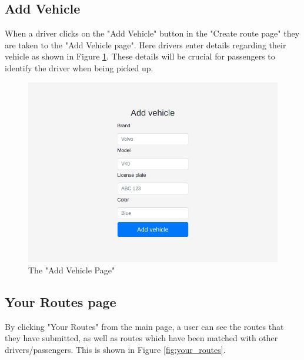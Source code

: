 \documentclass{article}
\begin{document}
\clearpage
\newpage
\subsection{Add Vehicle}
When a driver clicks on the "Add Vehicle" button in the "Create route page" they are taken to the "Add Vehicle page". Here drivers enter details regarding their vehicle as shown in Figure \ref{fig:add_vehicle}. These details will be crucial for passengers to identify the driver when being picked up.

\begin{figure}[h!]
    \centering
    \includegraphics[scale=0.5]{ssdFigures/add_vehicle.png}
    \caption{The "Add Vehicle Page"}
    \label{fig:add_vehicle}
\end{figure}

\clearpage
\newpage
\subsection{Your Routes page}
By clicking "Your Routes" from the main page, a user can see the routes that they have submitted, as well as routes which have been matched with other drivers/passengers. This is shown in Figure \ref{fig:your_routes}.
\end{document}
